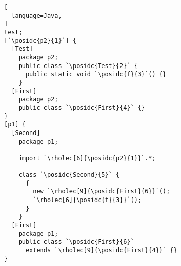 \begin{lstlisting}[
  language=Java,
]
test;
[`\posidc{p2}{1}`] {
  [Test]
    package p2;
    public class `\posidc{Test}{2}` {
      public static void `\posidc{f}{3}`() {}
    }
  [First]
    package p2;
    public class `\posidc{First}{4}` {}
}
[p1] {
  [Second]
    package p1;

    import `\rholec[6]{\posidc{p2}{1}}`.*;

    class `\posidc{Second}{5}` {
      {
        new `\rholec[9]{\posidc{First}{6}}`();
        `\rholec[6]{\posidc{f}{3}}`();
      }
    }
  [First]
    package p1;
    public class `\posidc{First}{6}`
      extends `\rholec[9]{\posidc{First}{4}}` {}
}
\end{lstlisting}%